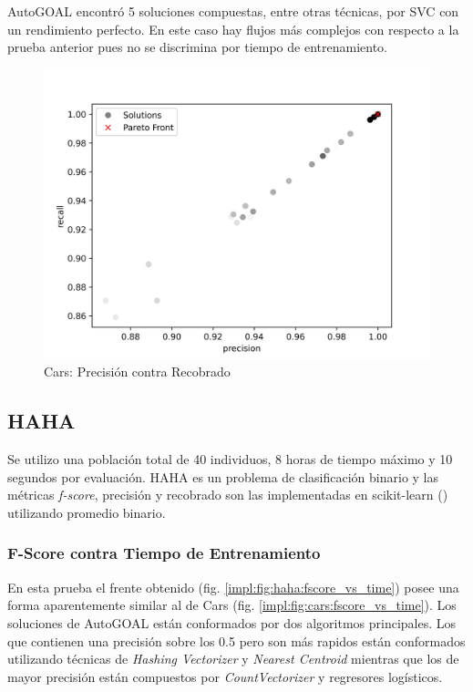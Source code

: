 AutoGOAL encontr\'o 5 soluciones compuestas, entre otras t\'ecnicas, por SVC con un rendimiento perfecto. En este caso hay flujos m\'as complejos con respecto a la prueba anterior pues no se discrimina por tiempo de entrenamiento.

\begin{figure}[ht]
    \centering
    \includegraphics[scale=0.65]{Pictures/cars_precision_vs_recall.jpg}
    \caption{Cars: Precisi\'on contra Recobrado}
    \label{impl:fig:cars:precision_vs_recall}
\end{figure}

\subsection{HAHA}
Se utilizo una poblaci\'on total de 40 individuos, 8 horas de tiempo m\'aximo y 10 segundos por  evaluaci\'on. 
HAHA es un problema de clasificaci\'on binario y las m\'etricas \textit{f-score}, precisi\'on y recobrado son las implementadas en scikit-learn (\cite{pedregosa2011scikit}) utilizando promedio binario.

\subsubsection{F-Score contra Tiempo de Entrenamiento}

En esta prueba el frente obtenido (fig. \ref{impl:fig:haha:fscore_vs_time}) posee una forma aparentemente similar al de Cars (fig. \ref{impl:fig:cars:fscore_vs_time}). Los soluciones de AutoGOAL  est\'an conformados por dos algoritmos principales. Los que contienen una precisi\'on sobre los 0.5 pero son m\'as rapidos est\'an conformados utilizando t\'ecnicas de \textit{Hashing Vectorizer} y \textit{Nearest Centroid} mientras que los de mayor precisi\'on est\'an compuestos por \textit{CountVectorizer}  y regresores log\'isticos.

